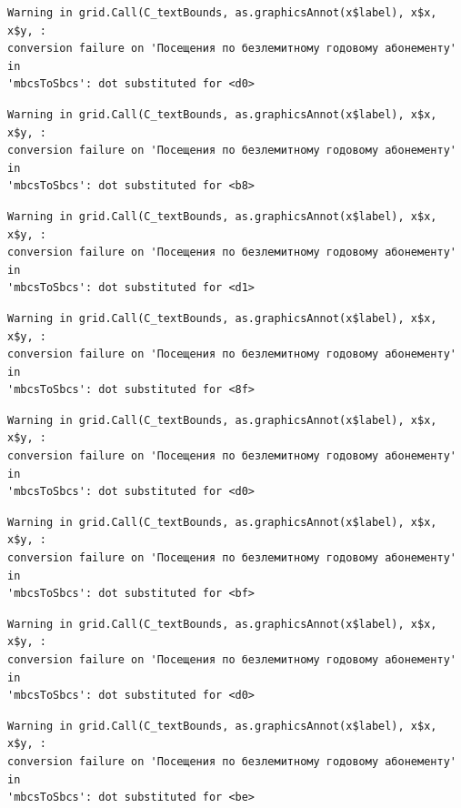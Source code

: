 \documentclass[
  letterpaper,
  DIV=11,
  numbers=noendperiod]{scrartcl}
\begin{document}
\begin{verbatim}
Warning in grid.Call(C_textBounds, as.graphicsAnnot(x$label), x$x, x$y, :
conversion failure on 'Посещения по безлемитному годовому абонементу' in
'mbcsToSbcs': dot substituted for <d0>
\end{verbatim}

\begin{verbatim}
Warning in grid.Call(C_textBounds, as.graphicsAnnot(x$label), x$x, x$y, :
conversion failure on 'Посещения по безлемитному годовому абонементу' in
'mbcsToSbcs': dot substituted for <b8>
\end{verbatim}

\begin{verbatim}
Warning in grid.Call(C_textBounds, as.graphicsAnnot(x$label), x$x, x$y, :
conversion failure on 'Посещения по безлемитному годовому абонементу' in
'mbcsToSbcs': dot substituted for <d1>
\end{verbatim}

\begin{verbatim}
Warning in grid.Call(C_textBounds, as.graphicsAnnot(x$label), x$x, x$y, :
conversion failure on 'Посещения по безлемитному годовому абонементу' in
'mbcsToSbcs': dot substituted for <8f>
\end{verbatim}

\begin{verbatim}
Warning in grid.Call(C_textBounds, as.graphicsAnnot(x$label), x$x, x$y, :
conversion failure on 'Посещения по безлемитному годовому абонементу' in
'mbcsToSbcs': dot substituted for <d0>
\end{verbatim}

\begin{verbatim}
Warning in grid.Call(C_textBounds, as.graphicsAnnot(x$label), x$x, x$y, :
conversion failure on 'Посещения по безлемитному годовому абонементу' in
'mbcsToSbcs': dot substituted for <bf>
\end{verbatim}

\begin{verbatim}
Warning in grid.Call(C_textBounds, as.graphicsAnnot(x$label), x$x, x$y, :
conversion failure on 'Посещения по безлемитному годовому абонементу' in
'mbcsToSbcs': dot substituted for <d0>
\end{verbatim}

\begin{verbatim}
Warning in grid.Call(C_textBounds, as.graphicsAnnot(x$label), x$x, x$y, :
conversion failure on 'Посещения по безлемитному годовому абонементу' in
'mbcsToSbcs': dot substituted for <be>
\end{verbatim}
\end{document}
